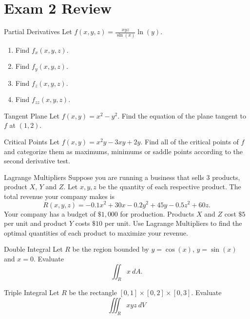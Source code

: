 \section*{Exam 2 Review}
\setcounter{counter}{0}
\begin{revex}{Partial Derivatives}
Let $f(x,y,z)=\frac{xyz}{\sin(x)}\ln(y)$.
\vspace{1em}
\begin{enumerate}
\item Find $f_x(x,y,z)$.
\vspace{1em}
\item Find $f_y(x,y,z)$.
\vspace{1em}
\item Find $f_z(x,y,z)$.
\vspace{1em}
\item Find $f_{zz}(x,y,z)$.
\end{enumerate}
\end{revex}

\begin{revex}{Tangent Plane}
Let $f(x,y)=x^2-y^2$. Find the equation of the plane tangent to $f$ at $(1,2)$.
\end{revex}

\begin{revex}{Critical Points}
Let $f(x,y)=x^2y-3xy+2y$. Find all of the critical points of $f$ and categorize them as maximums, minimums or saddle points according to the second derivative test.
\end{revex}

\begin{revex}{Lagrange Multipliers}
Suppose you are running a business that sells 3 products, product $X$, $Y$ and $Z$. Let $x,y,z$ be the quantity of each respective product. The total revenue your company makes is $$R(x,y,z)=-0.1x^2+30x-0.2y^2+45y-0.5z^2+60z.$$ Your company has a budget of $\$1,000$ for production. Products $X$ and $Z$ cost $\$5$ per unit and product $Y$ costs $\$10$ per unit. Use Lagrange Multipliers to find the optimal quantities of each product to maximize your revenue.
\end{revex}

\begin{revex}{Double Integral}
Let $R$ be the region bounded by $y=\cos(x)$, $y=\sin(x)$ and $x=0$. Evaluate $$\iint_R x \ dA. $$
\end{revex}

\begin{revex}{Triple Integral}
Let $R$ be the rectangle $[0,1]\times[0,2]\times[0,3].$ Evaluate $$\iiint_R xyz\ dV $$
\end{revex}

